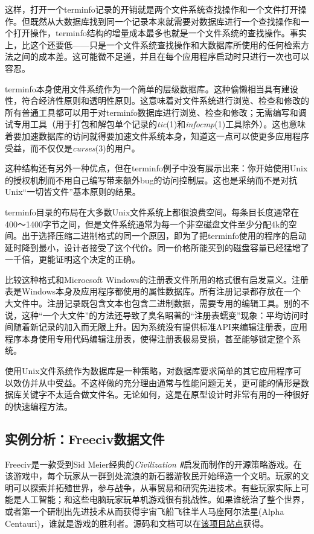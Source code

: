 \documentclass[12pt,oneside]{ctexbook}
\begin{document}
\begin{common-format}
这样，打开一个terminfo记录的开销就是两个文件系统查找操作和一个文件打开操作。但既然从大数据库找到同一个记录本来就需要对数据库进行一个查找操作和一个打开操作，terminfo结构的增量成本最多也就是一个文件系统的查找操作。事实上，比这个还要低——只是一个文件系统查找操作和大数据库所使用的任何检索方法之间的成本差。这可能微不足道，并且在每个应用程序启动时只进行一次也可以容忍。

terminfo本身使用文件系统作为一个简单的层级数据库。这种偷懒相当具有建设性，符合经济性原则和透明性原则。这意味着对文件系统进行浏览、检查和修改的所有普通工具都可以用于对terminfo数据库进行浏览、检查和修改；无需编写和调试专用工具（用于打包和解包单个记录的\textit{tic}(1)和\textit{infocmp}(1)工具除外）。这也意味着要加速数据库的访问就得要加速文件系统本身，知道这一点可以使更多应用程序受益，而不仅仅是\textit{curses}(3)的用户。

这种结构还有另外一种优点，但在terminfo例子中没有展示出来：你开始使用Unix的授权机制而不用自己编写带来额外bug的访问控制层。这也是采纳而不是对抗Unix“一切皆文件”基本原则的结果。

terminfo目录的布局在大多数Unix文件系统上都很浪费空间。每条目长度通常在400～1400字节之间，但是文件系统通常为每一个非空磁盘文件至少分配4k的空间。出于选择压缩二进制格式的同一个原因，即为了把terminfo使用的程序的启动延时降到最小，设计者接受了这个代价。同一价格所能买到的磁盘容量已经猛增了一千倍，更能证明这个决定的正确。

比较这种格式和Microcsoft Windows的注册表文件所用的格式很有启发意义。注册表是Windows本身及应用程序都使用的属性数据库。所有注册记录都存放在一个大文件中。注册记录既包含文本也包含二进制数据，需要专用的编辑工具。别的不说，这种“一个大文件”的方法还导致了臭名昭著的“注册表蠕变”现象：平均访问时间随着新记录的加入而无限上升。因为系统没有提供标准API来编辑注册表，应用程序本身使用专用代码编辑注册表，使得注册表极易受损，甚至能够锁定整个系统。

使用Unix文件系统作为数据库是一种策略，对数据库要求简单的其它应用程序可以效仿并从中受益。不这样做的充分理由通常与性能问题无关，更可能的情形是数据库关键字不太适合做文件名。无论如何，这是在原型设计时非常有用的一种很好的快速编程方法。


\subsection{实例分析：Freeciv数据文件}
Freeciv是一款受到Sid Meier经典的\textit{Civilization Ⅱ}启发而制作的开源策略游戏。在该游戏中，每个玩家从一群到处流浪的新石器游牧民开始缔造一个文明。玩家的文明可以探索并拓殖世界，参与战争，从事贸易和研究先进技术。有些玩家实际上可能是人工智能；和这些电脑玩家玩单机游戏很有挑战性。如果谁统治了整个世界，或者第一个研制出先进技术从而获得宇宙飞船飞往半人马座阿尔法星(Alpha Centauri)，谁就是游戏的胜利者。源码和文档可以在\href{http://www.freeciv.org/}{该项目站点}获得。


\end{common-format}
\end{document}
